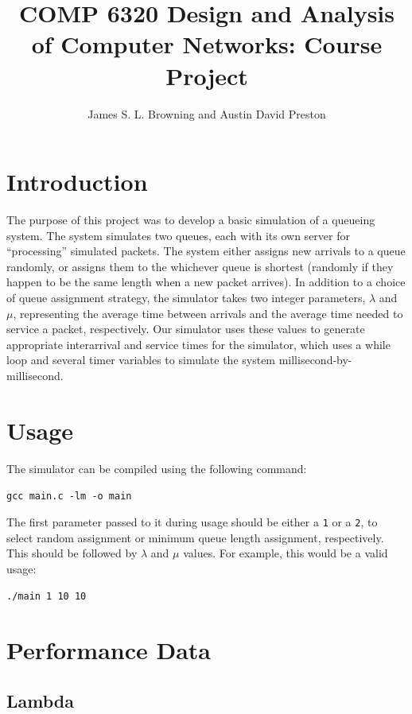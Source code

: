 \documentclass[11pt]{article} %
\title{COMP 6320 Design and Analysis of Computer Networks: Course Project}
\author{James S. L. Browning and Austin David Preston}
\begin{document}
\maketitle

\section{Introduction}

The purpose of this project was to develop a basic simulation of a queueing system. The system simulates two queues, each with its own server for “processing” simulated packets. The system either assigns new arrivals to a queue randomly, or assigns them to the whichever queue is shortest (randomly if they happen to be the same length when a new packet arrives). In addition to a choice of queue assignment strategy, the simulator takes two integer parameters, $\lambda$ and $\mu$, representing the average time between arrivals and the average time needed to service a packet, respectively. Our simulator uses these values to generate appropriate interarrival and service times for the simulator, which uses a while loop and several timer variables to simulate the system millisecond-by-millisecond.

\section{Usage}

The simulator can be compiled using the following command:

\begin{center}
\texttt{gcc main.c -lm -o main}
\end{center}

The first parameter passed to it during usage should be either a \texttt{1} or a \texttt{2}, to select random assignment or minimum queue length assignment, respectively. This should be followed by $\lambda$ and $\mu$ values. For example, this would be a valid usage:

\begin{center}
\texttt{./main 1 10 10}
\end{center}

\section{Performance Data}

\subsection{Lambda}
\end{document}

